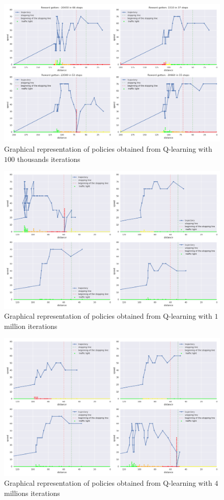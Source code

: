 \documentclass[14pt,a4paper]{article}
\theoremstyle{definition}
\begin{document}
\begin{figure}[H]
\centering
\includegraphics[scale=0.4]{img/traj3.png}
\caption{Graphical representation of  policies obtained from Q-learning with $100$ thousands  iterations}
\label{failure}
\end{figure}

\begin{figure}[H]
\centering
\includegraphics[scale=0.4]{img/traj1m.png}
\caption{Graphical representation of  policies obtained from Q-learning with $1$ million  iterations}
\end{figure}

\begin{figure}[H]
\centering
\includegraphics[scale=0.4]{img/traj4m.png}
\caption{Graphical representation of  policies obtained from Q-learning with $4$ millions  iterations}
\end{figure}
\end{document}
